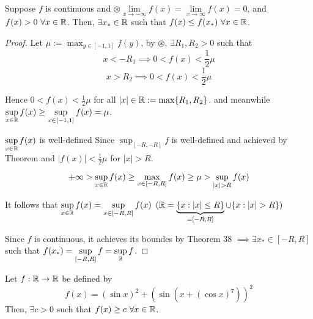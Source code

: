 \begin{example}
    Suppose $f$ is continuous and $\circledast \lim\limits_{x \to -\infty} f(x) = \lim\limits_{x \to \infty} f(x) = 0$, 
    and $f(x) > 0\ \forall x \in \mathbb R$. Then, $\exists x_* \in \mathbb R$ such that $f(x) \leq f(x_*)\ \forall x \in \mathbb R$.
\end{example}

\begin{proof}
    Let $\mu := \displaystyle\max_{y \in \left[-1, 1\right]} f(y)$, by $\circledast$, $\exists R_1, R_2 > 0$ such that
    $$x < -R_1 \implies 0 < f(x) < \frac{1}{2} \mu$$ 
    $$x > R_2 \implies 0 < f(x) < \frac{1}{2} \mu$$ 

    Hence $0 < f(x) < \frac{1}{2} \mu$ for all $|x| \in \mathbb R := \max\{R_1, R_2\}$.
    and meanwhile $\displaystyle\sup_{x \in \mathbb R} f(x) \geq \displaystyle\sup_{x \in \left[-1, 1\right]} f(x) = \mu$.

    $\displaystyle\sup_{x \in \mathbb R} f(x)$ is well-defined Since $\displaystyle\sup_{\left[-R, -R\right]} f $ is well-defined and achieved by Theorem and 
    $|f(x)| < \frac{1}{2}\mu$ for $|x| > R$.

    $$ + \infty > \sup_{x \in \mathbb R} f(x) \geq \max_{x \in \left[-R, R\right]} f(x) \geq \mu > \sup_{|x| > R} f(x)$$

    It follows that $\displaystyle\sup_{x\in\mathbb R} f(x) = \displaystyle\sup_{x \in \left[-R, R\right]} f(x)$
    $(\mathbb R = \underbrace{\{x : |x| \leq R\}}_{=\left[-R, R\right]} \cup \{x : |x| > R\})$

    Since $f$ is continuous, it achieves its boundes by Theorem 38
    $\implies \exists x_* \in \left[-R, R\right]$ such that $f(x_*) = \displaystyle\sup_{\left[-R, R\right]} f = \displaystyle\sup_{\mathbb R} f$.
\end{proof}

\begin{example}
    Let $f: \mathbb R \to \mathbb R$ be defined by 
    $$f(x) = (\sin x)^2 + (\sin (x + (\cos x)^7))^2$$
    Then, $\exists c > 0$ such that $f(x) \geq c\ \forall x \in \mathbb R$.
\end{example}

